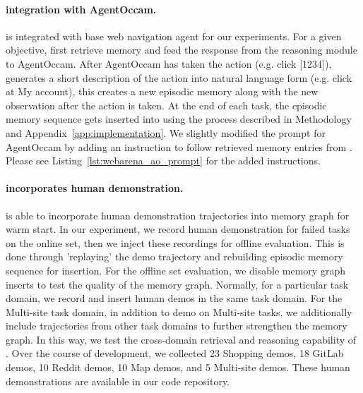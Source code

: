 \paragraph{\plugmem integration with AgentOccam.} \plugmem is integrated with base web navigation agent for our experiments. For a given objective, \plugmem first retrieve memory and feed the response from the reasoning module to AgentOccam. After AgentOccam has taken the action (e.g. click [1234]), \plugmem generates a short description of the action into natural language form (e.g. click at My account), this creates a new episodic memory along with the new observation after the action is taken. At the end of each task, the episodic memory sequence gets inserted into \plugmem using the process described in Methodology and Appendix~\ref{app:implementation}. We slightly modified the prompt for AgentOccam by adding an instruction to follow retrieved memory entries from \plugmem. Please see Listing~\ref{lst:webarena_ao_prompt} for the added instructions.

\paragraph{\plugmem incorporates human demonstration.} \plugmem is able to incorporate human demonstration trajectories into memory graph for warm start. In our experiment, we record human demonstration for failed tasks on the online set, then we inject these recordings for offline evaluation. This is done through 'replaying' the demo trajectory and rebuilding episodic memory sequence for insertion. For the offline set evaluation, we disable memory graph inserts to test the quality of the memory graph. Normally, for a particular task domain, we record and insert human demos in the same task domain. For the Multi-site task domain, in addition to demo on Multi-site tasks, we additionally include trajectories from other task domains to further strengthen the memory graph. In this way, we test the cross-domain retrieval and reasoning capability of \plugmem. Over the course of development, we collected 23 Shopping demos, 18 GitLab demos, 10 Reddit demos, 10 Map demos, and 5 Multi-site demos. These human demonstrations are available in our code repository. 

